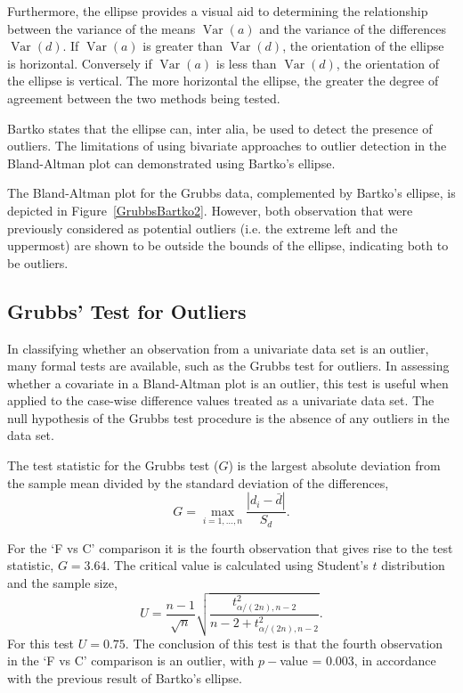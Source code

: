 \documentclass[12pt, a4paper]{report}
\theoremstyle{plain}
\theoremstyle{definition}
\theoremstyle{remark}
\begin{document}
Furthermore, the ellipse provides a visual aid to determining the relationship between the variance of the means $\operatorname{Var}(a)$ and the variance of the differences $\operatorname{Var}(d)$. If $\operatorname{Var}(a)$ is greater than $\operatorname{Var}(d)$, the orientation of the ellipse is horizontal. Conversely if $\operatorname{Var}(a)$ is less than $\operatorname{Var}(d)$, the orientation of the ellipse is vertical. The more horizontal the ellipse, the greater the degree of agreement between the two methods being tested.


Bartko states that the ellipse can, inter alia, be used to detect the presence of outliers. The limitations of using bivariate approaches to outlier detection in the Bland-Altman plot can demonstrated using Bartko's ellipse.


The Bland-Altman plot for the Grubbs data, complemented by Bartko's ellipse, is depicted in Figure~\ref{GrubbsBartko2}. However, both observation that were previously considered as potential outliers (i.e. the extreme left and the uppermost) are shown to be outside the bounds of the ellipse, indicating both to be outliers.

\subsection{Grubbs' Test for Outliers}

In classifying whether an observation from a univariate data set is an outlier, many formal tests are available, such as the Grubbs test for outliers. In assessing whether a covariate in a Bland-Altman plot is an outlier, this test is useful when applied to the case-wise difference values treated as a univariate data set. The null hypothesis of the Grubbs test procedure is the absence of any outliers in the data set. 

The test statistic for the Grubbs test ($G$) is the largest absolute deviation from the sample mean divided by the standard
deviation of the differences,
\begin{equation}
G =  \displaystyle\max_{i=1,\ldots, n}\frac{\left \vert d_i -
	\bar{d}\right\vert}{S_{d}}.
\end{equation}

For the `F vs C' comparison it is the fourth observation that gives rise to the test statistic, $G = 3.64$. The critical value is
calculated using Student's $t$ distribution and the sample size,
\[
U = \frac{n-1}{\sqrt{n}} \sqrt{\frac{t_{\alpha/(2n),n-2}^2}{n - 2
		+ t_{\alpha/(2n),n-2}^2}}.
\]
For this test $U = 0.75$. The conclusion of this test is that the fourth observation in the `F vs C' comparison is an outlier, with $p-$value = 0.003, in accordance with the previous result of Bartko's ellipse.
\end{document}
